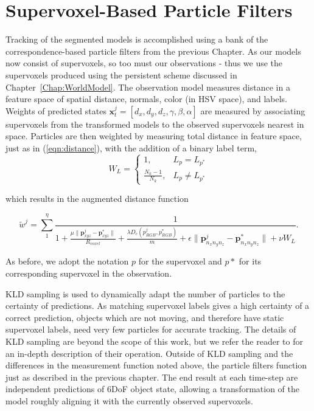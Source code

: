 \section{Supervoxel-Based Particle Filters}
Tracking of the segmented models is accomplished using a bank of the correspondence-based particle filters from the previous Chapter. As our models now consist of supervoxels, so too must our observations - thus we use the supervoxels produced using the persistent scheme discussed in Chapter~\ref{Chap:WorldModel}. The observation model measures distance in a feature space of spatial distance, normals, color (in HSV space), and labels. Weights of predicted states $\mathbf{x}^j_t = [d_x, d_y, d_z, \gamma, \beta, \alpha]$ are measured by associating supervoxels from the transformed models to the observed supervoxels nearest in space. Particles are then weighted by measuring total distance in feature space, just as in (\ref{eqn:distance}), with the addition of a binary label term,
\begin{equation}
  \label{eqn:dist_labels}
    W_L =  \begin{cases} 1, & L_p = L_{p^*} \\ 
                         \frac{N_k-1}{N_k}, & L_p \neq L_{p^*} 
           \end{cases} 
\end{equation}

which results in the augmented distance function

\begin{equation} \label{eqn:augmented_distance}
  \tilde{w}^j = \sum_{1}^{\eta} \frac{1}{1 + \frac {\mu \lVert \mathbf{p}^j_{xyz} - \mathbf{p}^*_{xyz} \rVert} {R_{voxel}} +  \frac{\lambda D_c(p^j_{RGB},p^*_{RGB})}{m} +   \epsilon \lVert \mathbf{p}^j_{n_x n_y n_z} - \mathbf{p}^*_{n_x n_y n_z} \rVert + \nu  W_L}.
\end{equation}

As before, we adopt the notation $p$ for the supervoxel and $p*$ for its corresponding supervoxel in the observation.

KLD sampling \cite{KLDParticleFilter} is used to dynamically adapt the number of particles to the certainty of predictions. As matching supervoxel labels gives a high certainty of a correct prediction, objects which are not moving, and therefore have static supervoxel labels, need very few particles for accurate tracking. The details of KLD sampling are beyond the scope of this work, but we refer the reader to \cite{KLDParticleFilter} for an in-depth description of their operation. Outside of KLD sampling and the differences in the measurement function noted above, the particle filters function just as described in the previous chapter. The end result at each time-step are independent predictions of 6DoF object state, allowing a transformation of the model roughly aligning it with the currently observed supervoxels.  

